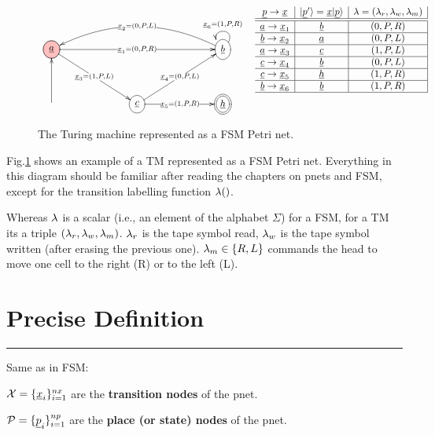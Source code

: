 \begin{figure}[h!]
$$
\begin{array}{cc}
\xymatrix@C=6pc@R=3pc{
\PinkCircle{\rva}
\ar[rr]|{\rvx_1=(0,P,R)}
\ar[rd]|{\rvx_3=(1,P, L)}
&&\Circle{\rvb}\ar@(ru,lu)[]_{\rvx_6=(1,P,R)}
\ar@/_2pc/[ll]|{\rvx_2=(0,P,L)}
\\
\ar[u]
&\Circle{\rvc}
\ar[ru]|{\rvx_4=(0,P, L)}
\ar[r]|{\rvx_5=(1,P, R)}
&\DCircle{\rvh}
}
&
\begin{array}{c|c|c|}
\rvp\rarrow \rvx
&\ket{\rvp'}=\rvx\ket{\rvp}
& \lam=(\lam_r,
\lam_w,
\lam_m)
\\
\hline\hline
\rva\rarrow\rvx_1
&\rvb
&(0,P,R)
\\ \hline
\rvb\rarrow\rvx_2
&\rva
&(0,P,L)
\\ \hline
\rva\rarrow\rvx_3
&\rvc
& (1,P,L)
\\ \hline
\rvc\rarrow\rvx_4
&\rvb
& (0,P,L)
\\\hline
\rvc\rarrow\rvx_5
&\rvh
&(1,P,R)
\\ \hline
\rvb\rarrow\rvx_6
&\rvb
&(1,P,R)
\\ \hline
\end{array}
\end{array}
$$
\caption{The  Turing machine represented as a FSM Petri net.}
\label{fig-3-state-bb}
\end{figure}

Fig.\ref{fig-3-state-bb} shows an example of
a TM represented as a FSM Petri net. Everything in this diagram
should be familiar after reading the chapters
on pnets and FSM, except for the
transition  labelling function $\lambda()$.

Whereas $\lambda$ is a scalar (i.e., an element of the alphabet $\Sigma$)
for a FSM, for a TM its a triple $(\lambda_r, \lambda_w, \lambda_m)$.
$\lambda_r$ is the tape symbol read, $\lambda_w$
is the tape symbol written (after erasing the 
previous one). $\lambda_m\in\{R, L\}$
commands the head to move one cell to the right (R)
or to the left (L).



\section{Precise Definition}

\hrule
Same as in FSM:

$\calx =\{\rvx_i\}_{i=1}^{nx}$ are the {\bf transition nodes} of the pnet.

$\calp =\{\rvp_i\}_{i=1}^{np}$ are the {\bf place (or state) nodes} of the pnet.

